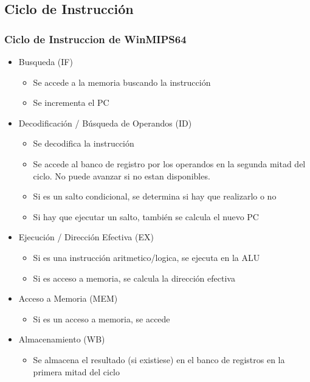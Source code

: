 \documentclass{beamer}
\begin{document}
\subsection{Ciclo de Instrucción}
\begin{frame}
\frametitle{Ciclo de Instruccion de WinMIPS64}
\begin{itemize}
\item Busqueda (IF) 
\begin{itemize}
  \item Se accede a la memoria buscando la instrucción
  \item Se incrementa el PC
\end{itemize}
\item Decodificación / Búsqueda de Operandos (ID)
\begin{itemize}
  \item Se decodifica la instrucción
  \item Se accede al banco de registro por los operandos en la segunda mitad del ciclo. No puede avanzar si no estan disponibles.
  \item Si es un salto condicional, se determina si hay que realizarlo o no 
  \item Si hay que ejecutar un salto, también se calcula el nuevo PC
\end{itemize}
\item Ejecución / Dirección Efectiva (EX) 
\begin{itemize}
  \item Si es una instrucción aritmetico/logica, se ejecuta en la ALU
  \item Si es acceso a memoria, se calcula la dirección efectiva
\end{itemize}
\item Acceso a Memoria (MEM) 
\begin{itemize}
  \item Si es un acceso a memoria, se accede
\end{itemize}
\item Almacenamiento (WB) 
\begin{itemize}
  \item Se almacena el resultado (si existiese) en el banco de registros en la primera mitad del ciclo
\end{itemize}
\end{itemize}
\end{frame}
\end{document}
